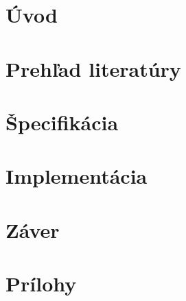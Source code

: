\chapter{Úvod}


\chapter{Prehľad literatúry}


\chapter{Špecifikácia}


\chapter{Implementácia}


\chapter{Záver}

\printbibliography
{}  %


\chapter*{Prílohy}   %

